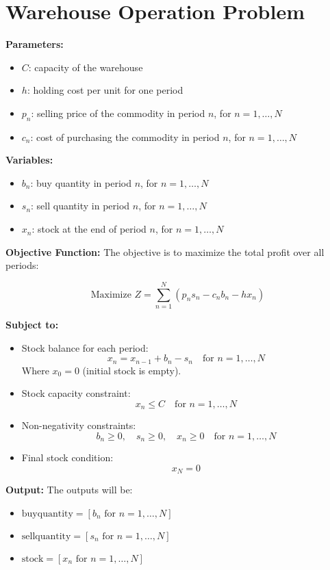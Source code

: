 \documentclass{article}
\begin{document}
\section*{Warehouse Operation Problem}

\textbf{Parameters:}
\begin{itemize}
    \item $C$: capacity of the warehouse
    \item $h$: holding cost per unit for one period
    \item $p_n$: selling price of the commodity in period $n$, for $n = 1, \ldots, N$
    \item $c_n$: cost of purchasing the commodity in period $n$, for $n = 1, \ldots, N$
\end{itemize}

\textbf{Variables:}
\begin{itemize}
    \item $b_n$: buy quantity in period $n$, for $n = 1, \ldots, N$
    \item $s_n$: sell quantity in period $n$, for $n = 1, \ldots, N$
    \item $x_n$: stock at the end of period $n$, for $n = 1, \ldots, N$
\end{itemize}

\textbf{Objective Function:}
The objective is to maximize the total profit over all periods:

\[
\text{Maximize } Z = \sum_{n=1}^{N} \left( p_n s_n - c_n b_n - h x_n \right)
\]

\textbf{Subject to:}
\begin{itemize}
    \item Stock balance for each period:
    \[
    x_n = x_{n-1} + b_n - s_n \quad \text{for } n = 1, \ldots, N
    \]
    Where $x_0 = 0$ (initial stock is empty).

    \item Stock capacity constraint:
    \[
    x_n \leq C \quad \text{for } n = 1, \ldots, N
    \]

    \item Non-negativity constraints:
    \[
    b_n \geq 0, \quad s_n \geq 0, \quad x_n \geq 0 \quad \text{for } n = 1, \ldots, N
    \]

    \item Final stock condition:
    \[
    x_N = 0
    \]
\end{itemize}

\textbf{Output:}
The outputs will be:
\begin{itemize}
    \item $\text{buyquantity} = [b_n \text{ for } n = 1,\ldots,N]$
    \item $\text{sellquantity} = [s_n \text{ for } n = 1,\ldots,N]$
    \item $\text{stock} = [x_n \text{ for } n = 1,\ldots,N]$
\end{itemize}
\end{document}
